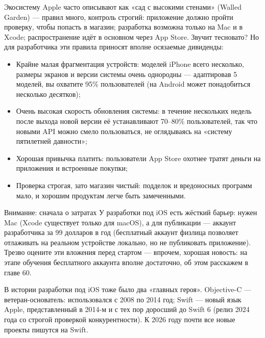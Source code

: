 
Экосистему Apple часто описывают как «сад с высокими стенами» (Walled Garden) — правил много, контроль строгий: приложение должно пройти проверку, чтобы попасть в магазин; разработка возможна только на Mac и в Xcode; распространение идёт в основном через App Store. Звучит тесновато? Но для разработчика эти правила приносят вполне осязаемые дивиденды:

\begin{itemize}
  \item Крайне малая фрагментация устройств: моделей iPhone всего несколько, размеры экранов и версии системы очень однородны — адаптировав 5 моделей, вы охватите 95\% пользователей (на Android может понадобиться несколько десятков);
  \item Очень высокая скорость обновления системы: в течение нескольких недель после выхода новой версии её устанавливают 70–80\% пользователей, так что новыми API можно смело пользоваться, не оглядываясь на «систему пятилетней давности»;
  \item Хорошая привычка платить: пользователи App Store охотнее тратят деньги на приложения и встроенные покупки;
  \item Проверка строгая, зато магазин чистый: подделок и вредоносных программ мало, и хорошим продуктам легче быть замеченными.
\end{itemize}

\begin{tcbwarn}{Внимание: сначала о затратах}
У разработки под iOS есть жёсткий барьер: нужен Mac (Xcode существует только для macOS), а для публикации — аккаунт разработчика за 99 долларов в год (бесплатный аккаунт физлица позволяет отлаживать на реальном устройстве локально, но не публиковать приложение). Трезво оцените эти вложения перед стартом — впрочем, хорошая новость: на этапе обучения бесплатного аккаунта вполне достаточно, об этом расскажем в главе 60.

\end{tcbwarn}


В истории разработки под iOS тоже было два «главных героя». Objective-C — ветеран-основатель: использовался с 2008 по 2014 год; Swift — новый язык Apple, представленный в 2014-м и с тех пор доросший до Swift 6 (релиз 2024 года со строгой проверкой конкурентности). К 2026 году почти все новые проекты пишутся на Swift.

